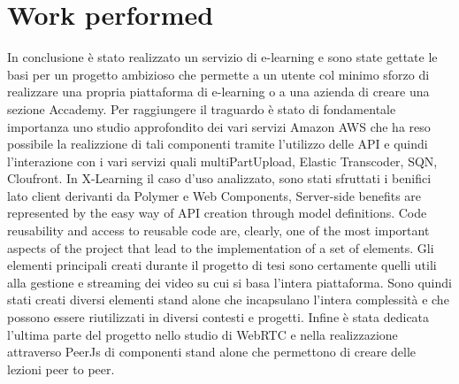 \section{Work performed}
\label{sec:work_performed}
 
In conclusione è stato realizzato un servizio di e-learning e sono state gettate le basi per un progetto ambizioso che permette a un utente col minimo sforzo di realizzare una propria piattaforma di e-learning o a una azienda di creare una sezione Accademy.
Per raggiungere il traguardo è stato di fondamentale importanza uno studio approfondito dei vari servizi Amazon AWS che ha reso possibile la realizzione di tali componenti tramite l'utilizzo delle API e quindi l'interazione con i vari servizi quali multiPartUpload, Elastic Transcoder, SQN, Cloufront.
In X-Learning il caso d'uso analizzato, sono stati sfruttati i benifici lato client derivanti da Polymer e Web Components, Server-side benefits are represented by the easy way of API creation through model definitions.
Code reusability and access to reusable code are, clearly, one of the most important aspects of the project that lead to the implementation of a set of elements.
Gli elementi principali creati durante il progetto di tesi sono certamente quelli utili alla gestione e streaming dei video su cui si basa l'intera piattaforma.
Sono quindi stati creati diversi elementi stand alone che incapsulano l'intera complessità e che possono essere riutilizzati in diversi contesti e progetti.
Infine è stata dedicata l'ultima parte del progetto nello studio di WebRTC e nella realizzazione attraverso PeerJs di componenti stand alone che permettono di creare delle lezioni peer to peer.